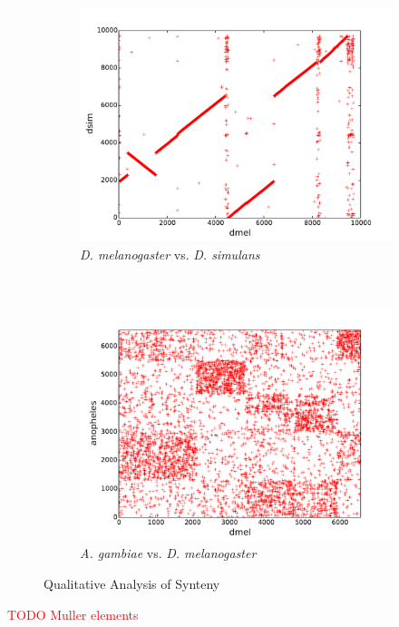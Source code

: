 \begin{figure}[H]
\begin{subfigure}[b]{0.45\textwidth}
    \includegraphics[width=\textwidth]{figures/synteny/dmel_dsim_plot}
    \caption{\emph{D. melanogaster} vs. \emph{D. simulans}}
    \label{fig:synteny-dotplots-drosophila}
  \end{subfigure}
  ~
  \begin{subfigure}[b]{0.45\textwidth}
    \includegraphics[width=\textwidth]{figures/synteny/dmel_anopheles_plot}
    \caption{\emph{A. gambiae} vs. \emph{D. melanogaster}}
    \label{fig:synteny-dotplots-anopheles-drosophila}
  \end{subfigure}
\label{fig:dot-plots}
\caption{Qualitative Analysis of Synteny}
\end{figure}

\textcolor{red}{TODO Muller elements}

